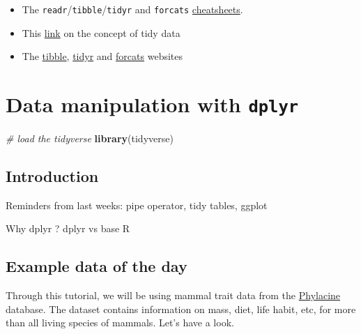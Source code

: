 \documentclass[]{book}
\newenvironment{Shaded}{}{}
\newcommand{\CommentTok}[1]{\textcolor[rgb]{0.38,0.63,0.69}{\textit{#1}}}
\newcommand{\KeywordTok}[1]{\textcolor[rgb]{0.00,0.44,0.13}{\textbf{#1}}}
\newcommand{\NormalTok}[1]{#1}
\providecommand{\tightlist}{%
  \setlength{\itemsep}{0pt}\setlength{\parskip}{0pt}}
\begin{document}
\begin{itemize}
\tightlist
\item
  The \texttt{readr}/\texttt{tibble}/\texttt{tidyr} and \texttt{forcats} \href{https://rstudio.com/resources/cheatsheets/}{cheatsheets}.
\item
  This \href{https://tidyr.tidyverse.org/articles/tidy-data.html}{link} on the concept of tidy data
\item
  The \href{https://tibble.tidyverse.org/}{tibble}, \href{https://tidyr.tidyverse.org/}{tidyr} and \href{https://forcats.tidyverse.org/}{forcats} websites
\end{itemize}

\hypertarget{data-manipulation-with-dplyr}{%
\chapter{\texorpdfstring{Data manipulation with \texttt{dplyr}}{Data manipulation with dplyr}}\label{data-manipulation-with-dplyr}}

\begin{Shaded}
\begin{Highlighting}[]
\CommentTok{# load the tidyverse}
\KeywordTok{library}\NormalTok{(tidyverse)}
\end{Highlighting}
\end{Shaded}

\hypertarget{introduction}{%
\section{Introduction}\label{introduction}}

Reminders from last weeks: pipe operator, tidy tables, ggplot

Why dplyr ? dplyr vs base R

\hypertarget{example-data-of-the-day}{%
\section{Example data of the day}\label{example-data-of-the-day}}

Through this tutorial, we will be using mammal trait data from the \href{https://megapast2future.github.io/PHYLACINE_1.2/}{Phylacine} database. The dataset contains information on mass, diet, life habit, etc, for more than all living species of mammals. Let's have a look.
\end{document}
